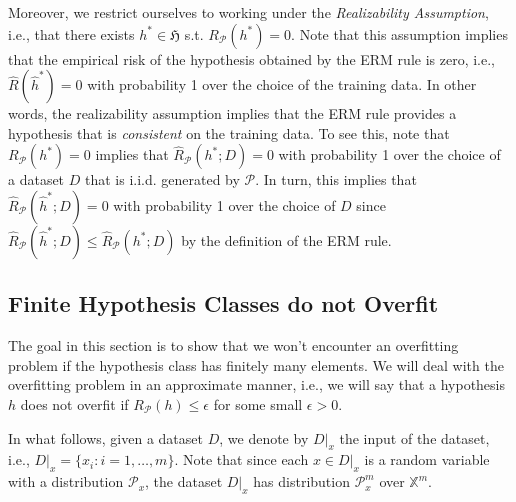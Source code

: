 Moreover, we restrict ourselves to working under the  
 \emph{Realizability Assumption}, i.e., that
there exists $h^* \in \mathfrak{H}$ s.t. $R_{\mathcal{P}}(h^*) = 0$. Note that
this assumption implies that the empirical risk of the hypothesis obtained by
the ERM rule is zero, i.e., $\hat{R}(\hat{h}^*) = 0$ with probability 1 over the
choice of the training data. In other words, the realizability assumption
implies that the ERM rule provides a hypothesis that is \emph{consistent} on the
training data. To see this, note that $R_\mathcal{P}(h^*)=0$ implies
that $\hat{R}_\mathcal{P}(h^*;D)=0$ with probability 1 over the choice of a
dataset $D$ that is i.i.d. generated by $\mathcal{P}$. In turn, this implies
that $\hat{R}_\mathcal{P}(\hat{h}^*;D)=0$ with probability 1 over the choice of
$D$ since $\hat{R}_\mathcal{P}(\hat{h}^*;D) \leq \hat{R}_\mathcal{P}(h^*;D)$ by
the definition of the ERM rule.

\subsection{Finite Hypothesis Classes do not Overfit}
The goal in this section is to show that we won't encounter an overfitting
problem if the hypothesis class has finitely many elements. We will deal with
the overfitting problem in an approximate manner, i.e., we will say that a
hypothesis $h$ does not overfit if $R_\mathcal{P}(h)\leq \epsilon$ for some
small $\epsilon>0$.

In what follows, given a dataset $D$, we denote by $D|_x$ the input of the
dataset, i.e., $D|_x=\{x_i: i=1,\dots,m\}$. Note that since each $x\in D|_x$ is a
random variable with a distribution $\mathcal{P}_x$, the dataset $D|_x$ has distribution $\mathcal{P}^m_x$ over $\mathbb{X}^m$.

